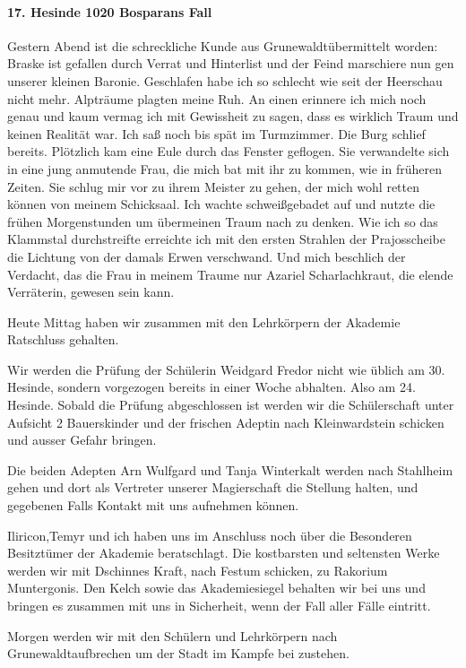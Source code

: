 \paragraph{17. Hesinde 1020 Bosparans Fall}
Gestern Abend ist die schreckliche Kunde aus Grunewaldtübermittelt worden: Braske ist gefallen durch Verrat und Hinterlist und der Feind marschiere nun gen unserer kleinen Baronie. Geschlafen habe ich so schlecht wie seit der Heerschau nicht mehr. Alpträume plagten meine Ruh. An einen erinnere ich mich noch genau und kaum vermag ich mit Gewissheit zu sagen, dass es wirklich Traum und keinen Realität war. Ich saß noch bis spät im Turmzimmer. Die Burg schlief bereits. Plötzlich kam eine Eule durch das Fenster geflogen. Sie verwandelte sich in eine jung anmutende Frau, die mich bat mit ihr zu kommen, wie in früheren Zeiten. Sie schlug mir vor zu ihrem Meister zu gehen, der mich wohl retten können von meinem Schicksaal. Ich wachte schweißgebadet auf und nutzte die frühen Morgenstunden um übermeinen Traum nach zu denken. Wie ich so das Klammstal durchstreifte erreichte ich mit den ersten Strahlen der Prajosscheibe die Lichtung von der damals Erwen verschwand. Und mich beschlich der Verdacht, das die Frau in meinem Traume nur Azariel Scharlachkraut, die elende Verräterin, gewesen sein kann.

Heute Mittag haben wir zusammen mit den Lehrkörpern der Akademie Ratschluss gehalten.

Wir werden die Prüfung der Schülerin Weidgard Fredor nicht wie üblich am 30. Hesinde, sondern vorgezogen bereits in einer Woche abhalten. Also am 24. Hesinde. Sobald die Prüfung abgeschlossen ist werden wir die Schülerschaft unter Aufsicht 2 Bauerskinder und der frischen Adeptin nach Kleinwardstein schicken und ausser Gefahr bringen.

Die beiden Adepten Arn Wulfgard und Tanja Winterkalt werden nach Stahlheim gehen und dort als Vertreter unserer Magierschaft die Stellung halten, und gegebenen Falls Kontakt mit uns aufnehmen können.

Iliricon,Temyr und ich haben uns im Anschluss noch über die Besonderen Besitztümer der Akademie beratschlagt. Die kostbarsten und seltensten Werke werden wir mit Dschinnes Kraft, nach Festum schicken, zu Rakorium Muntergonis. Den Kelch sowie das Akademiesiegel behalten wir bei uns und bringen es zusammen mit uns in Sicherheit, wenn der Fall aller Fälle eintritt.

Morgen werden wir mit den Schülern und Lehrkörpern nach Grunewaldtaufbrechen um der Stadt im Kampfe bei zustehen.


